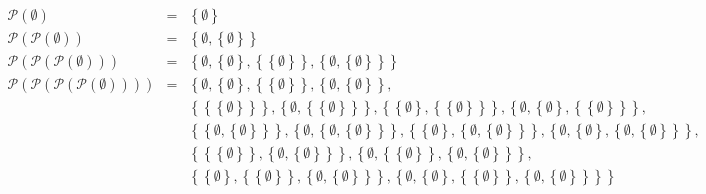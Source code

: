 \documentclass[10pt]{scrbook}
\begin{document}
\begin{Loe}
\begin{eqnarray*}
\mathcal{P}(\emptyset) & = & \left\{\emptyset\right\} \\
\mathcal{P}(\mathcal{P}(\emptyset)) & = & \left\{\emptyset, \left\{\emptyset\right\}\right\} \\
\mathcal{P}(\mathcal{P}(\mathcal{P}(\emptyset))) & = & \left\{\emptyset, \left\{\emptyset\right\}, \left\{\left\{\emptyset\right\}\right\}, \left\{\emptyset, \left\{\emptyset\right\}\right\} \right\} \\
\mathcal{P}(\mathcal{P}(\mathcal{P}(\mathcal{P}(\emptyset)))) & = & \left\{
\emptyset, 
\left\{\emptyset\right\},
\left\{\left\{\emptyset\right\}\right\},
\left\{\emptyset, \left\{\emptyset\right\}\right\},\right. \\
& & \left.
\left\{\left\{\left\{\emptyset\right\}\right\}\right\},
\left\{\emptyset, \left\{\left\{\emptyset\right\}\right\}\right\},
\left\{\left\{\emptyset\right\}, \left\{\left\{\emptyset\right\}\right\}\right\},
\left\{\emptyset, \left\{\emptyset\right\}, \left\{\left\{\emptyset\right\}\right\}\right\},
\right. \\
& & \left.
\left\{\left\{\emptyset, \left\{\emptyset\right\}\right\} \right\}, 
\left\{\emptyset, \left\{\emptyset, \left\{\emptyset\right\}\right\}\right\},
\left\{\left\{\emptyset\right\}, \left\{\emptyset, \left\{\emptyset\right\}\right\}\right\},
\left\{\emptyset, \left\{\emptyset\right\}, \left\{\emptyset, \left\{\emptyset\right\}\right\}\right\},
\right. \\
& & 
\left.
\left\{\left\{\left\{\emptyset\right\}\right\}, \left\{\emptyset, \left\{\emptyset\right\}\right\}\right\},
\left\{\emptyset, \left\{\left\{\emptyset\right\}\right\}, \left\{\emptyset, \left\{\emptyset\right\}\right\}\right\}, \right. \\
& & \left.
\left\{\left\{\emptyset\right\}, \left\{\left\{\emptyset\right\}\right\}, \left\{\emptyset, \left\{\emptyset\right\}\right\}\right\},
\left\{\emptyset, \left\{\emptyset\right\}, \left\{\left\{\emptyset\right\}\right\}, \left\{\emptyset, \left\{\emptyset\right\}\right\}\right\}
\right\}
\end{eqnarray*}
\end{Loe}
\end{document}
